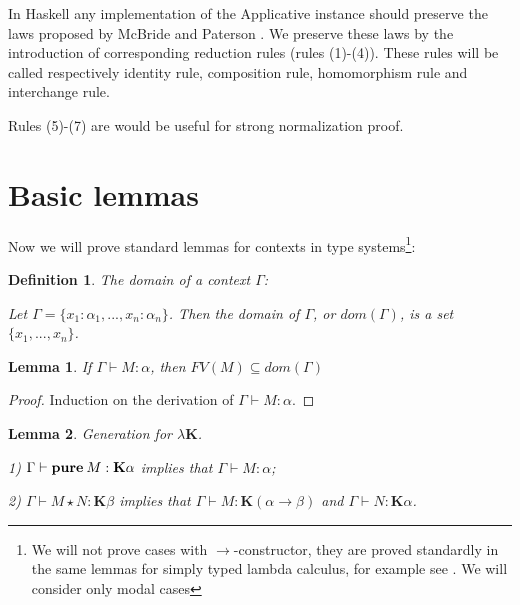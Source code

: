 \documentclass[a4paper]{article}
\newtheorem{lemma}{Lemma}
\newtheorem{defin}{Definition}
\begin{document}
  In Haskell any implementation of the Applicative instance should preserve the laws proposed by McBride and
  Paterson \cite{McP}. We preserve these laws by the introduction of corresponding reduction rules (rules
  (1)-(4)). These rules will be called respectively identity rule, composition rule, homomorphism rule and
  interchange rule.

  Rules (5)-(7) are would be useful for strong normalization proof.



  \section{Basic lemmas}

  Now we will prove standard lemmas for contexts in type systems\footnote{We will not prove cases with
  $\to$-constructor, they are proved standardly in the same lemmas for simply typed lambda calculus, for
  example see \cite{Neder}\cite{Morten}\cite{Girard}. We will consider only modal cases}:

  \begin{defin} The domain of a context $\Gamma$:

  Let $\Gamma = \{ x_1 : \alpha_1, ..., x_n : \alpha_n \}$. Then the domain of $\Gamma$, or $dom(\Gamma)$, is a set $\{  x_1, ..., x_n\}$.

  \end{defin}

  \begin{lemma}

  If $\Gamma \vdash M : \alpha$, then $FV(M) \subseteq dom(\Gamma)$

  \end{lemma}

  \begin{proof}

  Induction on the derivation of $\Gamma \vdash M : \alpha$.

  \end{proof}

  \vspace{\baselineskip}

  \begin{lemma} Generation for $\lambda \textbf{K}$.

  1) $\Gamma \vdash {\bf pure \: } M : \textbf{K}\alpha$ implies that $\Gamma \vdash M : \alpha$;

  2) $\Gamma \vdash M \star N : \textbf{K}\beta$ implies that $\Gamma \vdash M : \textbf{K}(\alpha \to \beta)$ and
  $\Gamma \vdash N : \textbf{K}\alpha$.
  \end{lemma}
\end{document}
